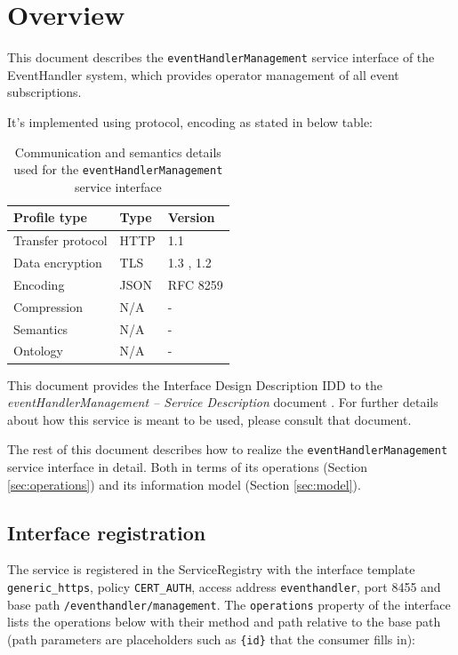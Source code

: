 \documentclass[a4paper]{arrowhead}
\begin{document}
\section{Overview}
\label{sec:overview}

This document describes the \texttt{event\allowbreak{}Handler\allowbreak{}Management} service interface of the EventHandler system, which provides operator management of all event subscriptions.

It's implemented using protocol, encoding as stated in below table:
\begin{table}[ht!]
  \centering
  \begin{tabular}{|l|l|l|}
    \hline
    \rowcolor{gray!33} Profile type & Type & Version \\ \hline
    Transfer protocol & HTTP & 1.1 \cite{rfc9112} \\ \hline
    Data encryption & TLS & 1.3 \cite{rfc8446}, 1.2 \cite{rfc5246} \\ \hline
    Encoding & JSON & RFC 8259 \cite{rfc8259} \\ \hline
    Compression & N/A & - \\ \hline
    Semantics & N/A & - \\ \hline
    Ontology & N/A & - \\ \hline
  \end{tabular}
  \caption{Communication and semantics details used for the \texttt{event\allowbreak{}Handler\allowbreak{}Management} service interface}
  \label{tab:comunication_semantics_profile}
\end{table}

This document provides the Interface Design Description IDD to the \textit{eventHandlerManagement -- Service Description} document \cite{eh-eventHandlerManagement-sd}.
For further details about how this service is meant to be used, please consult that document.

The rest of this document describes how to realize the \texttt{event\allowbreak{}Handler\allowbreak{}Management} service
interface in detail. Both in terms of its operations (Section \ref{sec:operations}) and its information model (Section \ref{sec:model}).

\subsection{Interface registration}

The service is registered in the ServiceRegistry with the interface template \texttt{generic\_\allowbreak{}https}, policy \texttt{CERT\_\allowbreak{}AUTH}, access address \texttt{eventhandler}, port 8455 and base path \texttt{/\allowbreak{}eventhandler/\allowbreak{}management}. The \texttt{operations} property of the interface lists the operations below with their method and path relative to the base path (path parameters are placeholders such as \texttt{\{id\}} that the consumer fills in):
\end{document}
